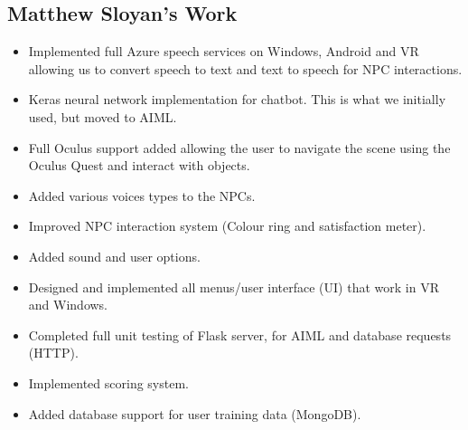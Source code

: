 \subsection{Matthew Sloyan's Work}
\begin{itemize}
    \item Implemented full Azure speech services on Windows, Android and VR allowing us to convert speech to text and text to speech for NPC interactions.
    \item Keras neural network implementation for chatbot. This is what we initially used, but moved to AIML.
    \item Full Oculus support added allowing the user to navigate the scene using the Oculus Quest and interact with objects.
    \item Added various voices types to the NPCs.
    \item Improved NPC interaction system (Colour ring and satisfaction meter).
    \item Added sound and user options.
    \item Designed and implemented all menus/user interface (UI) that work in VR and Windows.
    \item Completed full unit testing of Flask server, for AIML and database requests (HTTP).
    \item Implemented scoring system.
    \item Added database support for user training data (MongoDB).
\end{itemize}
